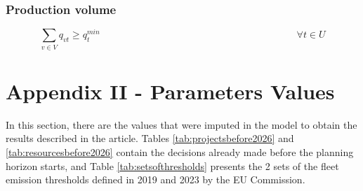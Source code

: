 \subsubsection*{Production volume}
\begin{equation}
    \sum_{v \in V}q_{vt} \geq q_t^{min} \qquad\qquad\qquad\qquad \qquad\qquad\qquad\qquad\qquad\qquad \forall t\in U\label{eq:A.22}
\end{equation}
\newpage
\section{Appendix II - Parameters Values}\label{section:Appendix Two - Parameters}
In this section, there are the values that were imputed in the model to obtain the results described in the article. Tables \ref{tab:projectsbefore2026} and \ref{tab:resourcesbefore2026} contain the decisions already made before the planning horizon starts, and Table \ref{tab:setsofthresholds} presents the 2 sets of the fleet emission thresholds defined in 2019 and 2023 by the EU Commission.


